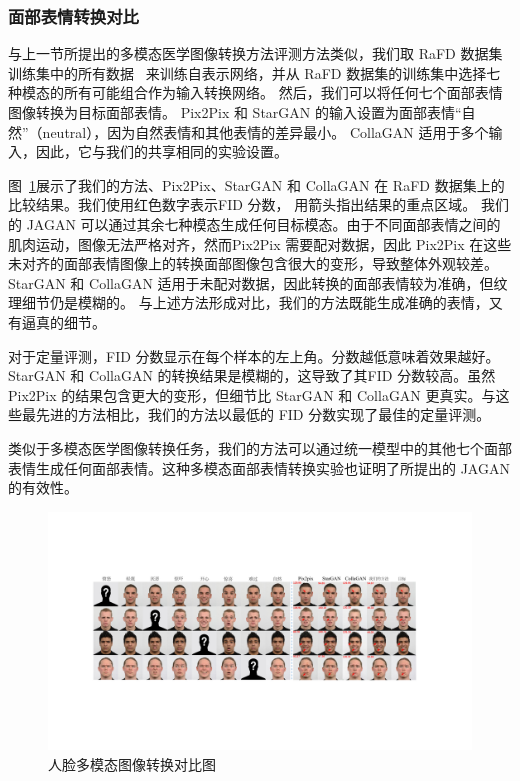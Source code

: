 \subsubsection{面部表情转换对比}
与上一节所提出的多模态医学图像转换方法评测方法类似，我们取 RaFD 数据集训练集中的所有数据~\cite{langner2010presentation} 来训练自表示网络，并从 RaFD 数据集的训练集中选择七种模态的所有可能组合作为输入转换网络。
然后，我们可以将任何七个面部表情图像转换为目标面部表情。 Pix2Pix 和 StarGAN 的输入设置为面部表情“自然”（neutral），因为自然表情和其他表情的差异最小。 CollaGAN 适用于多个输入，因此，它与我们的共享相同的实验设置。

图~\ref{fig:comparsion_facial}展示了我们的方法、Pix2Pix、StarGAN 和 CollaGAN 在 RaFD 数据集上的比较结果。我们使用红色数字表示FID 分数， 用箭头指出结果的重点区域。 我们的 JAGAN 可以通过其余七种模态生成任何目标模态。由于不同面部表情之间的肌肉运动，图像无法严格对齐，然而Pix2Pix 需要配对数据，因此 Pix2Pix 在这些未对齐的面部表情图像上的转换面部图像包含很大的变形，导致整体外观较差。 StarGAN 和 CollaGAN 适用于未配对数据，因此转换的面部表情较为准确，但纹理细节仍是模糊的。
与上述方法形成对比，我们的方法既能生成准确的表情，又有逼真的细节。

对于定量评测，FID 分数显示在每个样本的左上角。分数越低意味着效果越好。 StarGAN 和 CollaGAN 的转换结果是模糊的，这导致了其FID 分数较高。虽然 Pix2Pix 的结果包含更大的变形，但细节比 StarGAN 和 CollaGAN 更真实。与这些最先进的方法相比，我们的方法以最低的 FID 分数实现了最佳的定量评测。

类似于多模态医学图像转换任务，我们的方法可以通过统一模型中的其他七个面部表情生成任何面部表情。这种多模态面部表情转换实验也证明了所提出的 JAGAN 的有效性。

\begin{figure}
	\begin{center}
		\includegraphics[width=1\columnwidth]{figures/JAGAN/comparsion_facial.pdf}
	\end{center}
	\caption{人脸多模态图像转换对比图}
	\label{fig:comparsion_facial}
\end{figure}

